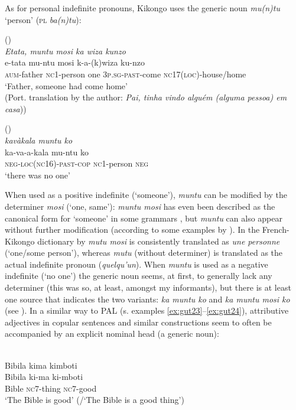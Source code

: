 \documentclass[output=paper,colorlinks,citecolor=brown]{langscibook}
\begin{document}
As for personal indefinite pronouns, Kikongo uses the generic noun \textit{mu(n)tu} ‘person’ (\textsc{pl} \textit{ba(n)tu}): 

\ea \label{ex:gut35}(\cite[][117]{Kyala2013})\\
    \textit{Etata, muntu mosi ka wiza kunzo}\\
    \gll e-tata mu-ntu mosi k-a-(k)wiza ku-nzo\\
    \textsc{aum}-father \textsc{nc1}-person one \textsc{3p.sg-past}-come \textsc{nc17}(\textsc{loc})-house/home\\
    \glt ‘Father, someone had come home’\\
    (Port. translation by the author: \textit{Pai, tinha vindo alguém (alguma pessoa) em casa}))
    
    \ex \label{ex:gut36}(\citealt[][40]{Carter1999})\\
    \textit{kavàkala muntu ko}\\
    \gll ka-va-a-kala mu-ntu ko\\
    \textsc{neg-loc(nc16)}-\textsc{past-cop} \textsc{nc1}-person \textsc{neg}\\
    \glt ‘there was no one’
\z

When used as a positive indefinite (‘someone’), \textit{muntu} can be modified by the determiner \textit{mosi} (‘one, same’): \textit{muntu mosi} has even been described as the canonical form for ‘someone’ in some grammars \citep[][52--54]{Kyala2013}, but \textit{muntu} can also appear without further modification (according to some examples by \cite[][s.v. \textit{muntu}]{Laman1936}). In the French-Kikongo dictionary by \citet{BiyokoMabua2017} \textit{mutu mosi} is consistently translated as \textit{une personne} (‘one/some person’), whereas \textit{mutu} (without determiner) is translated as the actual indefinite pronoun (\textit{quelqu’un}). When \textit{muntu} is used as a negative indefinite (‘no one’) the generic noun seems, at first, to generally lack any determiner (this was so, at least, amongst my informants), but there is at least one source that indicates the two variants: \textit{ka muntu ko} and \textit{ka muntu mosi ko} (see \cite[][s.v. \textit{personne}]{Dereau1957}).  
In a similar way to PAL (s. examples \ref{ex:gut23}--\ref{ex:gut24}), attributive adjectives in copular sentences and similar constructions seem to often be accompanied by an explicit nominal head (a generic noun): 

\ea\label{ex:gut37}\citep[][150]{BiyokoMabua2017}\\
Bibila kima kimboti\\
\gll Bibila ki-ma ki-mboti\\
Bible \textsc{nc7}-thing \textsc{nc7}-good\\
\glt ‘The Bible is good’ (/‘The Bible is a good thing’)
\z
\end{document}
